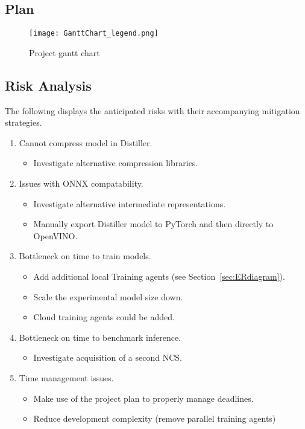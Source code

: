 \documentclass[../../D1.tex]{subfiles}
\begin{document}
\subsection{Plan}

\begin{figure}[h]
    \texttt{[image: GanttChart\_legend.png]}
    \caption{Project gantt chart}
    \label{fig:ganttChart}
\end{figure}

\subsection{Risk Analysis}
The following displays the anticipated risks with their accompanying mitigation strategies.
\begin{enumerate}
    \item Cannot compress model in Distiller.
    \begin{itemize}
        \item Investigate alternative compression libraries.
    \end{itemize}

    \item Issues with ONNX compatability.
    \begin{itemize}
        \item Investigate alternative intermediate representations.
        \item Manually export Distiller model to PyTorch and then directly to OpenVINO.
    \end{itemize}

    \item Bottleneck on time to train models.
    \begin{itemize}
        \item Add additional local Training agents (see Section~\ref{sec:ERdiagram}).
        \item Scale the experimental model size down.
        \item Cloud training agents could be added.
    \end{itemize}

    \item Bottleneck on time to benchmark inference.
    \begin{itemize}
        \item Investigate acquisition of a second NCS.
    \end{itemize}

    \item Time management issues.
    \begin{itemize}
        \item Make use of the project plan to properly manage deadlines.
        \item Reduce development complexity (remove parallel training agents)
    \end{itemize}


\end{enumerate}
\end{document}
